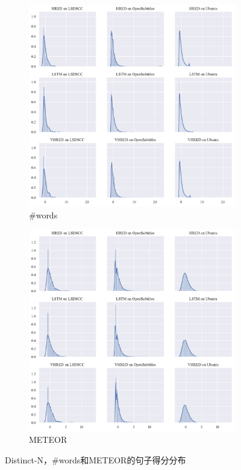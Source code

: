 \begin{figure}[H]
    \begin{subfigure}{0.5\linewidth}
        \centering
        \includegraphics[width=\linewidth]{figure/distplot_grid/utterance_len/plot.pdf}
        \caption{\#words}
        \label{fig:words_dist_all}
    \end{subfigure}%
    \begin{subfigure}{0.5\linewidth}
        \centering
        \includegraphics[width=\linewidth]{figure/distplot_grid/meteor/plot.pdf}
        \caption{METEOR}
        \label{fig:meteor_dist_all}
    \end{subfigure}
    \caption{Distinct-N，\#words和METEOR的句子得分分布}
    \label{fig:Other_dist_all}
\end{figure}
